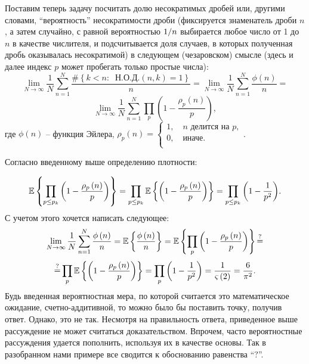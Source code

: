\begin{problem}
Поставим теперь задачу посчитать долю несократимых дробей или, другими 
словами, ``вероятность'' несократимости дроби (фиксируется знаменатель дроби 
$n$, а затем случайно, с равной вероятностью $1 \mathord{\left/ {\vphantom 
{1 n}} \right. \kern-\nulldelimiterspace} n$ выбирается любое число от 1 до 
$n$ в качестве числителя, и подсчитывается доля случаев, в которых 
полученная дробь оказывалась несократимой) в следующем (чезаровском) смысле 
(здесь и далее индекс $p$ может пробегать только простые числа):
\[
\mathop {\lim }\limits_{N\to \infty } \frac{1}{N}\sum\limits_{n=1}^N 
{\frac{\# \left\{ {k<n:\;\;\text{Н.О.Д.}\left( {n,k} \right)=1} \right\}}{n}} 
=\mathop {\lim }\limits_{N\to \infty } \frac{1}{N}\sum\limits_{n=1}^N 
{\frac{\phi \left( n \right)}{n}} = \]\[\mathop {\lim }\limits_{N\to \infty } 
\frac{1}{N}\sum\limits_{n=1}^N {\prod\limits_p {\left( {1-\frac{\rho _p 
\left( n \right)}{p}} \right)} } ,
\]
где $\phi \left( n \right)$ -- функция Эйлера, $\rho _p \left( n 
\right)=\left\{ {\begin{array}{l}
 1,\quad n\mbox{ делится на }p, \\ 
 0,\quad \mbox{иначе}. \\ 
 \end{array}} \right.$.

\noindent Согласно введенному выше определению плотности:

\[
\mathrm{{\mathbb E}}\left\{ {\prod\limits_{p\le p_k } {\left( {1-\frac{\rho _p \left( n 
\right)}{p}} \right)} } \right\}=\prod\limits_{p\le p_k } {\mathrm{{\mathbb E}}\left\{ {\left( 
{1-\frac{\rho _p \left( n \right)}{p}} \right)} \right\}} 
=\prod\limits_{p\le p_k } {\left( {1-\frac{1}{p^2}} \right)} .
\]
С учетом этого хочется написать следующее:
\[
\mathop {\lim }\limits_{N\to \infty } \frac{1}{N}\sum\limits_{n=1}^N 
{\frac{\phi \left( n \right)}{n}} =\mathrm{{\mathbb E}}\left\{ {\frac{\phi \left( n 
\right)}{n}} \right\}=\mathrm{{\mathbb E}}\left\{ {\prod\limits_p {\left( {1-\frac{\rho _p 
\left( n \right)}{p}} \right)} } \right\}\mathop =\limits^? 
\]
\[
\mathop =\limits^? \prod\limits_p {\mathrm{{\mathbb E}}\left\{ {\left( {1-\frac{\rho _p \left( 
n \right)}{p}} \right)} \right\}} =\prod\limits_p {\left( {1-\frac{1}{p^2}} 
\right)} =\frac{1}{\varsigma \left( 2 \right)}=\frac{6}{\pi ^2}.
\]
Будь введенная вероятностная мера, по которой считается это математическое 
ожидание, счетно-аддитивной, то можно было бы поставить точку, получив 
ответ. Однако, это не так. Несмотря на правильность ответа, 
приведенное выше рассуждение не может считаться доказательством. Впрочем, 
часто вероятностные рассуждения удается пополнить, используя их в качестве 
основы. Так в разобранном нами примере все сводится к обоснованию равенства 
``$?$''.


\end{problem}
